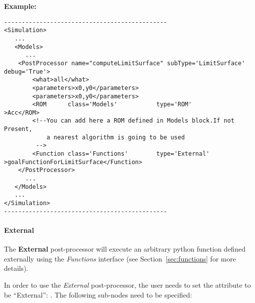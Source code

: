 \textbf{Example:}
\begin{lstlisting}[style=XML]
----------------------------------------------
<Simulation>
   ...
   <Models>
      ...
    <PostProcessor name="computeLimitSurface" subType='LimitSurface' debug='True'>
        <what>all</what>
        <parameters>x0,y0</parameters>
        <parameters>x0,y0</parameters>
        <ROM      class='Models'           type='ROM'             >Acc</ROM>
        <!--You can add here a ROM defined in Models block.If not Present,
            a nearest algorithm is going to be used
         -->
        <Function class='Functions'        type='External'        >goalFunctionForLimitSurface</Function>
    </PostProcessor>
      ...
   </Models>
   ...
</Simulation>
----------------------------------------------
\end{lstlisting}
\paragraph{External}
\label{External}
The \textbf{External} post-processor will execute an arbitrary python function
defined externally using the \textit{Functions} interface (see 
Section~\ref{sec:functions} for more details).
%

In order to use the \textit{External} post-processor, the user needs to set the
 attribute to be ``External'': 
.
% 
The following sub-nodes need to be specified:

